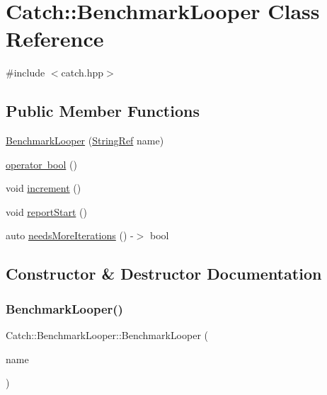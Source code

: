 \hypertarget{class_catch_1_1_benchmark_looper}{}\section{Catch\+:\+:Benchmark\+Looper Class Reference}
\label{class_catch_1_1_benchmark_looper}


{\ttfamily \#include $<$catch.\+hpp$>$}

\subsection*{Public Member Functions}
\begin{DoxyCompactItemize}
\item 
\mbox{\hyperlink{class_catch_1_1_benchmark_looper_ab9ba6397306a70082f39e63a8a71bde6}{Benchmark\+Looper}} (\mbox{\hyperlink{class_catch_1_1_string_ref}{String\+Ref}} name)
\item 
\mbox{\hyperlink{class_catch_1_1_benchmark_looper_a54da41bada9da038dc05faf41d746765}{operator bool}} ()
\item 
void \mbox{\hyperlink{class_catch_1_1_benchmark_looper_a210552aff5b19408637444d4bb35d59c}{increment}} ()
\item 
void \mbox{\hyperlink{class_catch_1_1_benchmark_looper_a0697d1b266112b110edf2025b82c4e77}{report\+Start}} ()
\item 
auto \mbox{\hyperlink{class_catch_1_1_benchmark_looper_a97bd944521f519b1593a5d1d2f9998fa}{needs\+More\+Iterations}} () -\/$>$ bool
\end{DoxyCompactItemize}


\subsection{Constructor \& Destructor Documentation}
\mbox{\label{class_catch_1_1_benchmark_looper_ab9ba6397306a70082f39e63a8a71bde6}} 
\subsubsection{\texorpdfstring{Benchmark\+Looper()}{BenchmarkLooper()}}
{\footnotesize\ttfamily Catch\+::\+Benchmark\+Looper\+::\+Benchmark\+Looper (\begin{DoxyParamCaption}\item[{\mbox{\hyperlink{class_catch_1_1_string_ref}{String\+Ref}}}]{name }\end{DoxyParamCaption})\hspace{0.3cm}{\ttfamily [inline]}}



